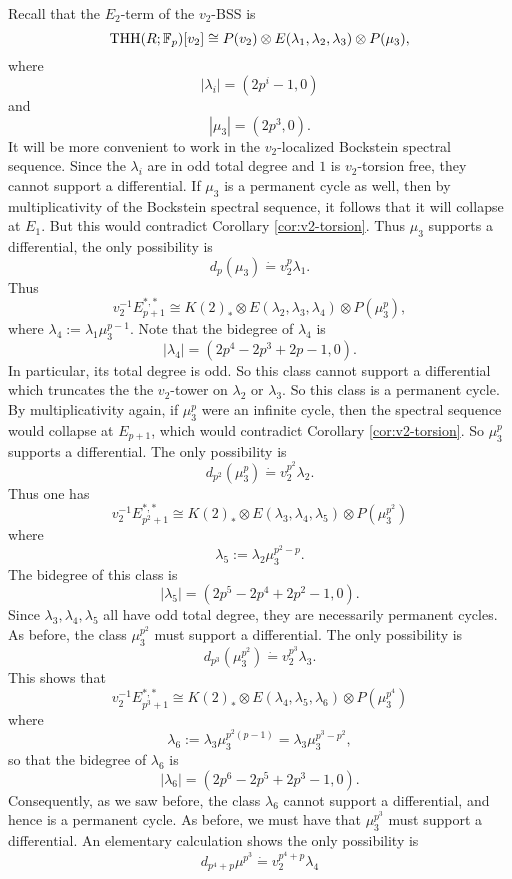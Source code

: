 Recall that the $E_2$-term of the $v_2$-BSS is 
\[
\operatorname{THH}(R;\mathbb{F}_p)[v_2]\cong P(v_2) \otimes E(\lambda_1,\lambda_2,\lambda_3)\otimes P(\mu_3),
\]
where
\[
|\lambda_i| = (2p^i-1, 0)
\]
and 
\[
|\mu_3|=(2p^3,0).
\]
It will be more convenient to work in the $v_2$-localized Bockstein spectral sequence. Since the $\lambda_i$ are in odd total degree and $1$ is $v_2$-torsion free, they cannot support a differential. If $\mu_3$ is a permanent cycle as well, then by multiplicativity of the Bockstein spectral sequence, it follows that it will collapse at $E_1$. But this would contradict Corollary \ref{cor:v2-torsion}. Thus $\mu_3$ supports a differential, the only possibility is 
\[
d_p(\mu_3)\dot{=}v_2^p\lambda_1.
\]
Thus 
\[
v_2^{-1}E_{p+1}^{*,*}\cong K(2)_*\otimes E(\lambda_2, \lambda_3, \lambda_4)\otimes P(\mu_3^{p}),
\]
where $\lambda_4:=\lambda_1\mu_3^{p-1}$. Note that the bidegree of $\lambda_4$ is
\[
|\lambda_4| = (2p^4-2p^3+2p-1,0).
\]
In particular, its total degree is odd. So this class cannot support a differential which truncates the the $v_2$-tower on $\lambda_2$ or $\lambda_3$. So this class is a permanent cycle. By multiplicativity again, if $\mu_3^p$ were an infinite cycle, then the spectral sequence would collapse at $E_{p+1}$, which would contradict Corollary \ref{cor:v2-torsion}. So $\mu_3^p$ supports a differential. The only possibility is 
\[
d_{p^2}(\mu_3^p) \dot{=} v_2^{p^2}\lambda_2.
\]  
Thus one has 
\[
v_2^{-1}E_{p^2+1}^{*,*}\cong K(2)_*\otimes E(\lambda_3, \lambda_4, \lambda_5)\otimes P(\mu_3^{p^2})
\]
where 
\[
\lambda_5:= \lambda_2\mu_3^{p^2-p}.
\]
The bidegree of this class is 
\[
|\lambda_5| = (2p^5-2p^4+2p^2-1,0).
\]
Since $\lambda_3, \lambda_4, \lambda_5$ all have odd total degree, they are necessarily permanent cycles. As before, the class $\mu_3^{p^2}$ must support a differential. The only possibility is 
\[
d_{p^3}(\mu_3^{p^2})\dot{=}v_2^{p^3}\lambda_3.
\]
This shows that 
\[
v_2^{-1}E_{p^3+1}^{*,*}\cong K(2)_*\otimes E(\lambda_4,\lambda_5, \lambda_6)\otimes P(\mu_3^{p^4})
\]
where
\[
\lambda_6:= \lambda_3\mu_3^{p^2(p-1)} = \lambda_3\mu_3^{p^3-p^2},
\]
so that the bidegree of $\lambda_6$ is 
\[
|\lambda_6|=(2p^6-2p^5+2p^3-1,0).
\]
Consequently, as we saw before, the class $\lambda_6$ cannot support a differential, and hence is a permanent cycle. As before, we must have that $\mu_3^{p^3}$ must support a differential. An elementary calculation shows the only possibility is 
\[
d_{p^4+p}\mu^{p^3}\dot{=} v_2^{p^4+p}\lambda_4
\]

